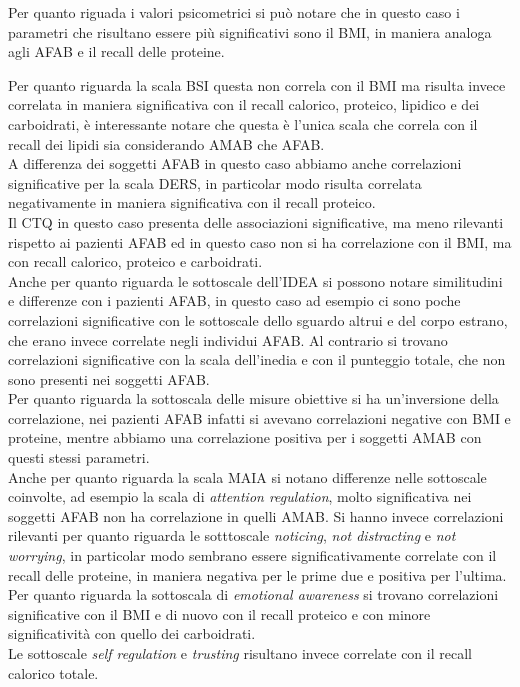 \documentclass[12pt]{article}
\begin{document}
Per quanto riguada i valori psicometrici si può notare che in questo caso i parametri che risultano essere più significativi sono il BMI, in maniera analoga agli AFAB e il recall delle proteine.

Per quanto riguarda la scala BSI questa non correla con il BMI ma risulta invece correlata in maniera significativa con il recall calorico, proteico, lipidico e dei carboidrati, è interessante notare che questa è l'unica scala che correla con il recall dei lipidi sia considerando AMAB che AFAB. \\
A differenza dei soggetti AFAB in questo caso abbiamo anche correlazioni significative per la scala DERS, in particolar modo risulta correlata negativamente in maniera significativa con il recall proteico. \\
Il CTQ in questo caso presenta delle associazioni significative, ma meno rilevanti rispetto ai pazienti AFAB ed in questo caso non si ha correlazione con il BMI, ma con recall calorico, proteico e carboidrati. \\
Anche per quanto riguarda le sottoscale dell'IDEA si possono notare similitudini e differenze con i pazienti AFAB, in questo caso ad esempio ci sono poche correlazioni significative con le sottoscale dello sguardo altrui e del corpo estrano, che erano invece correlate negli individui AFAB. Al contrario si trovano correlazioni significative con la scala dell'inedia e con il punteggio totale, che non sono presenti nei soggetti AFAB. \\
Per quanto riguarda la sottoscala delle misure obiettive si ha un'inversione della correlazione, nei pazienti AFAB infatti si avevano correlazioni negative con BMI e proteine, mentre abbiamo una correlazione positiva per i soggetti AMAB con questi stessi parametri. \\
Anche per quanto riguarda la scala MAIA si notano differenze nelle sottoscale coinvolte, ad esempio la scala di \emph{attention regulation}, molto significativa nei soggetti AFAB non ha correlazione in quelli AMAB. Si hanno invece correlazioni rilevanti per quanto riguarda le sotttoscale \emph{noticing}, \emph{not distracting} e \emph{not worrying}, in particolar modo sembrano essere significativamente correlate con il recall delle proteine, in maniera negativa per le prime due e positiva per l'ultima. \\
Per quanto riguarda la sottoscala di \emph{emotional awareness} si trovano correlazioni significative con il BMI e di nuovo con il recall proteico e con minore significatività con quello dei carboidrati. \\
Le sottoscale \emph{self regulation} e \emph{trusting} risultano invece correlate con il recall calorico totale.
\end{document}
